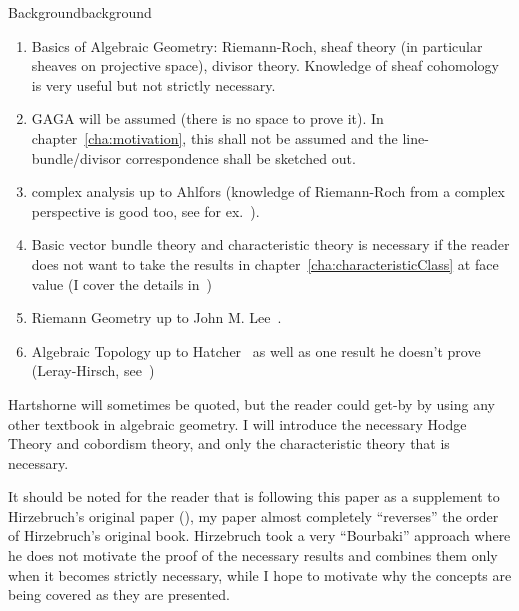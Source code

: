 \documentclass{book}
\begin{document}
\begin{titledBox}{Background}{background}
  \begin{enumerate}
  \item Basics of Algebraic Geometry: Riemann-Roch, sheaf theory (in particular sheaves on projective space),
    divisor theory. Knowledge of sheaf cohomology is very useful but not strictly necessary.
  \item GAGA will be assumed (there is no space to prove it). In chapter~\ref{cha:motivation}, this shall not
    be assumed and the line-bundle/divisor correspondence shall be sketched out.
  \item complex analysis up to Ahlfors (knowledge of Riemann-Roch from a complex perspective is good too,
    see for ex.~\cite{a.griffithsIntroductionAlgebraicCurves}).
  \item Basic vector bundle theory and characteristic theory is necessary if the reader does not want to take the results in
    chapter~\ref{cha:characteristicClass} at face value (I cover the details in~\cite{NateKTheory})
  \item Riemann Geometry up to John M. Lee~\cite{leeIntroductionRiemannianManifolds2018}.
  \item Algebraic Topology up to Hatcher~\cite{hatcherAlgebraicTopology} as well as one result he doesn't prove (Leray-Hirsch,
    see~\cite{NateAlgTop})
\end{enumerate}
\end{titledBox}

Hartshorne will sometimes be quoted, but the reader could get-by by using any other textbook in algebraic
geometry. I will introduce the necessary Hodge Theory and cobordism theory, and only the characteristic theory
that is necessary.

It should be noted for the reader that is following this paper as a supplement to Hirzebruch's original paper
(\cite{hirzebruchTopologicalMethodsAlgebraic1995}), my paper almost completely ``reverses'' the order of
Hirzebruch's original book. Hirzebruch took a very ``Bourbaki'' approach where he does not motivate the proof
of the necessary results and combines them only when it becomes strictly necessary, while I hope to motivate
why the concepts are being covered as they are presented.

\end{document}
